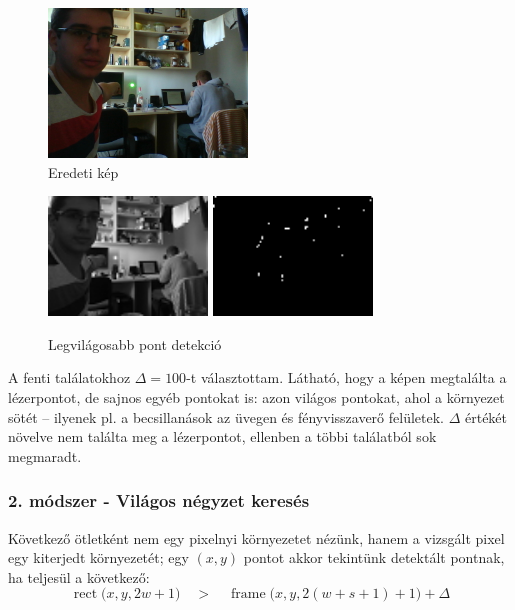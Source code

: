 \documentclass[a4paper,oneside]{article}
\DeclareMathOperator{\myRect}{rect}
\DeclareMathOperator{\myFrame}{frame}
\begin{document}
\begin{figure}[tbh]
  \centering
  \includegraphics[width=150pt]{figs/laser1.png}
  \caption{Eredeti kép \label{fig:laser1-1}}
\end{figure}

\begin{figure}[tbh]
  \centering
  \includegraphics[width=120pt]{figs/laser1-a.png} \hspace{20pt}  \includegraphics[width=120pt]{figs/laser1-b.png}
  \caption{Legvilágosabb pont detekció \label{fig:laser1-2}}
\end{figure}

A fenti találatokhoz $\Delta = 100$-t választottam. Látható, hogy a képen megtalálta a lézerpontot, de sajnos egyéb pontokat is: azon világos pontokat, ahol a környezet sötét -- ilyenek pl. a becsillanások az üvegen és fényvisszaverő felületek. $\Delta$ értékét növelve nem találta meg a lézerpontot, ellenben a többi találatból sok megmaradt.

\subsubsection{2. módszer - Világos négyzet keresés}

Következő ötletként nem egy pixelnyi környezetet nézünk, hanem a vizsgált pixel egy kiterjedt környezetét; egy $(x,y)$ pontot akkor tekintünk detektált pontnak, ha teljesül a következő:
\[\myRect\Big(x, y, 2w+1\Big) \quad > \quad \myFrame\Big(x, y, 2(w+s+1)+1\Big) + \Delta\]
\end{document}

